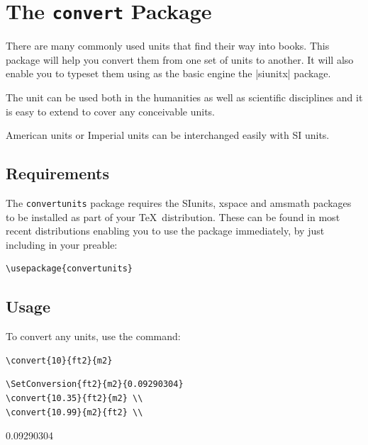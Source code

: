 \documentclass{tufte-book}
\def\convertunits{\texttt{convertunits}\xspace}
\gdef\SetConversion#1#2#3{%
\expandafter\gdef\csname#1#2\endcsname{#3}%
\gdef\Temp{#3}%
\FPdiv\invert{1}{\Temp}%
\expandafter\gdef\csname#2#1\endcsname{\invert}%
}
\begin{document}
\makeatletter

\chapter{The \texttt{convert} Package}

There are many commonly used units that find their way into books. This package will help you convert them from one set of units to another. It will also enable you to typeset them using as the basic engine the |siunitx| package.

The unit can be used both in the humanities as well as scientific disciplines and it is easy to extend to cover any conceivable units.

American units or Imperial units can be interchanged easily with SI units.

\section{Requirements}
The \convertunits package  requires the SIunits, xspace and amsmath packages to be installed as part
of your \TeX\ distribution. These can be found in most recent distributions enabling you to use the package immediately, by just including in your preable:

\begin{verbatim}
\usepackage{convertunits}
\end{verbatim}

\section{Usage}
To convert any units, use the command:

\begin{verbatim}
\convert{10}{ft2}{m2}
\end{verbatim}


\begin{verbatim}
\SetConversion{ft2}{m2}{0.09290304}
\convert{10.35}{ft2}{m2} \\
\convert{10.99}{m2}{ft2} \\
\end{verbatim}

\SetConversion{ft2}{m2}{0.09290304}

 \\
\end{document}
